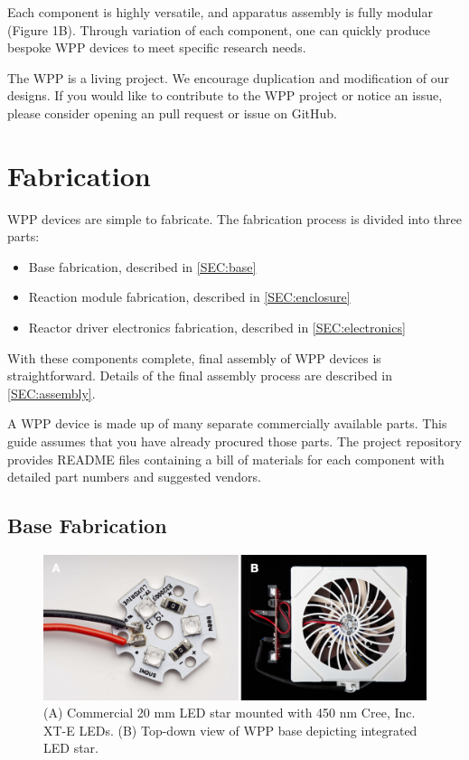 \documentclass[11pt]{article}
\let\stdsection\section
\renewcommand\section{\clearpage\stdsection}
\begin{document}
Each component is highly versatile, and apparatus assembly is fully modular (Figure 1B).
Through variation of each component, one can quickly produce bespoke WPP devices to meet specific research needs.

The WPP is a living project.
We encourage duplication and modification of our designs.
If you would like to contribute to the WPP project or notice an issue, please consider opening an pull request or issue on GitHub.

\section{Fabrication}

WPP devices are simple to fabricate.
The fabrication process is divided into three parts:

\begin{itemize}
	\item Base fabrication, described in \autoref{SEC:base}
	\item Reaction module fabrication, described in \autoref{SEC:enclosure}
	\item Reactor driver electronics fabrication, described in \autoref{SEC:electronics}
\end{itemize}

With these components complete, final assembly of WPP devices is straightforward.
Details of the final assembly process are described in \autoref{SEC:assembly}.

A WPP device is made up of many separate commercially available parts.
This guide assumes that you have already procured those parts.
The project repository provides README files containing a bill of materials for each component with detailed part numbers and suggested vendors.

\subsection{Base Fabrication} \label{SEC:base}

\begin{figure}[H]
	\includegraphics[width=\textwidth]{"./fig2.png"}
	\caption{(A) Commercial 20 mm LED star mounted with 450 nm Cree, Inc. XT-E LEDs. (B) Top-down view of WPP base depicting integrated LED star.}
\end{figure}
\end{document}
